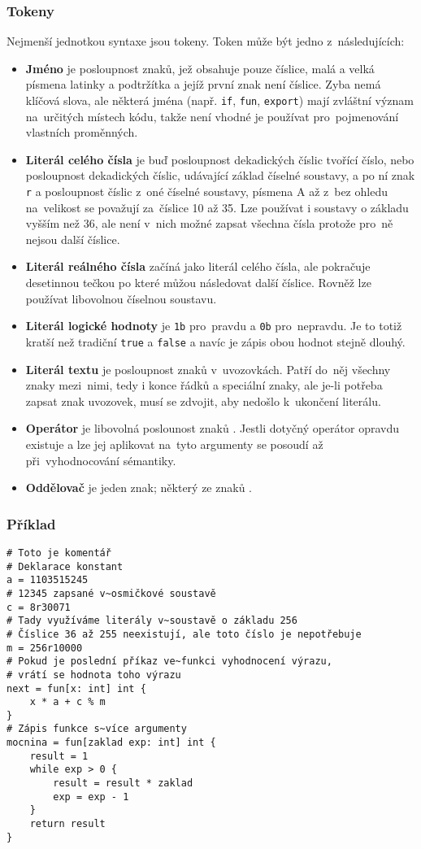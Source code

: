 \documentclass[a4paper,12pt]{article}
\def\circumflex{\char`\^}
\begin{document}
\subsubsection{Tokeny}
Nejmenší jednotkou syntaxe jsou tokeny. Token může být jedno z~následujících:
\begin{itemize}
\item \textbf{Jméno} je posloupnost znaků, jež obsahuje pouze číslice, malá a velká písmena latinky a podtržítka a jejíž první znak není číslice. Zyba nemá klíčová slova, ale některá jména (např. \texttt{if}, \texttt{fun}, \texttt{export}) mají zvláštní význam na~určitých místech kódu, takže není vhodné je používat pro~pojmenování vlastních proměnných.
\item \textbf{Literál celého čísla} je buď posloupnost dekadických číslic tvořící číslo, nebo posloupnost dekadických číslic, udávající základ číselné soustavy, a po ní znak \texttt{r} a posloupnost číslic z~oné číselné soustavy, písmena A až z~bez ohledu na~velikost se považují za~číslice 10 až 35. Lze používat i soustavy o základu vyšším než 36, ale není v~nich možné zapsat všechna čísla protože pro~ně nejsou další číslice.
\item \textbf{Literál reálného čísla} začíná jako literál celého čísla, ale pokračuje desetinnou tečkou po které můžou následovat další číslice. Rovněž lze používat libovolnou číselnou soustavu.
\item \textbf{Literál logické hodnoty} je \texttt{1b} pro~pravdu a \texttt{0b} pro~nepravdu. Je to totiž kratší než tradiční \texttt{true} a \texttt{false} a navíc je zápis obou hodnot stejně dlouhý.
\item \textbf{Literál textu} je posloupnost znaků v~uvozovkách. Patří do~něj všechny znaky mezi~nimi, tedy i konce řádků a speciální znaky, ale je-li potřeba zapsat znak uvozovek, musí se zdvojit, aby nedošlo k~ukončení literálu.
\item \textbf{Operátor} je libovolná poslounost znaků \uv{\texttt{+-*/\%\&|\textasciitilde\circumflex<>=!}}. Jestli dotyčný operátor opravdu existuje a lze jej aplikovat na~tyto argumenty se posoudí až při~vyhodnocování sémantiky.
\item \textbf{Oddělovač} je jeden znak; některý ze znaků .
\end{itemize}

\subsubsection{Příklad}
\begin{verbatim}
# Toto je komentář
# Deklarace konstant
a = 1103515245
# 12345 zapsané v~osmičkové soustavě
c = 8r30071
# Tady využíváme literály v~soustavě o základu 256
# Číslice 36 až 255 neexistují, ale toto číslo je nepotřebuje
m = 256r10000
# Pokud je poslední příkaz ve~funkci vyhodnocení výrazu,
# vrátí se hodnota toho výrazu
next = fun[x: int] int {
    x * a + c % m
}
# Zápis funkce s~více argumenty
mocnina = fun[zaklad exp: int] int {
    result = 1
    while exp > 0 {
    	result = result * zaklad
    	exp = exp - 1
    }
    return result
}
\end{verbatim}
\end{document}
